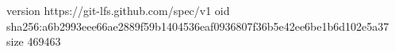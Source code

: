 version https://git-lfs.github.com/spec/v1
oid sha256:a6b2993eee66ae2889f59b1404536eaf0936807f36b5e42ee6be1b6d102e5a37
size 469463

